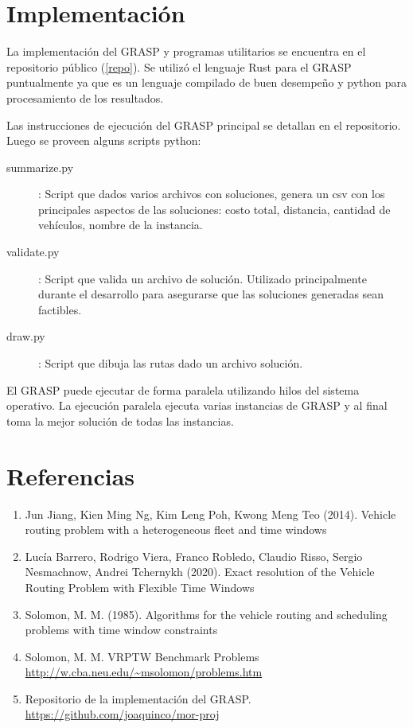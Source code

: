 \documentclass{article}
\begin{document}
  \section*{Implementación}

  La implementación del GRASP y programas utilitarios se encuentra en el repositorio público (\ref{repo}). Se utilizó el lenguaje Rust para el GRASP puntualmente ya que es un lenguaje compilado de buen desempeño y python para procesamiento de los resultados.

  Las instrucciones de ejecución del GRASP principal se detallan en el repositorio. Luego se proveen alguns scripts python:
  \begin{description}
    \item[summarize.py]: Script que dados varios archivos con soluciones, genera un csv con los principales aspectos de las soluciones: costo total, distancia, cantidad de vehículos, nombre de la instancia.
    \item[validate.py]: Script que valida un archivo de solución. Utilizado principalmente durante el desarrollo para asegurarse que las soluciones generadas sean factibles.
    \item[draw.py]: Script que dibuja las rutas dado un archivo solución.
  \end{description}

  El GRASP puede ejecutar de forma paralela utilizando hilos del sistema operativo. La ejecución paralela ejecuta varias instancias de GRASP y al final toma la mejor solución de todas las instancias.

  \section*{Referencias}

  \begin{enumerate}
    \item{\label{jiang} Jun Jiang, Kien Ming Ng, Kim Leng Poh, Kwong Meng Teo (2014). Vehicle routing problem with a heterogeneous fleet and time windows}
    \item{\label{inco} Lucía Barrero, Rodrigo Viera, Franco Robledo, Claudio Risso, Sergio Nesmachnow, Andrei Tchernykh (2020). Exact resolution of the Vehicle Routing Problem with Flexible Time Windows}
    \item{\label{solomon} Solomon, M. M. (1985). Algorithms for the vehicle routing and scheduling problems with time window constraints}
    \item{\label{solomoninstances} Solomon, M. M. VRPTW Benchmark Problems \url{http://w.cba.neu.edu/~msolomon/problems.htm}}
    \item{\label{repo} Repositorio de la implementación del GRASP. \url{https://github.com/joaquinco/mor-proj}}
  \end{enumerate}
\end{document}
